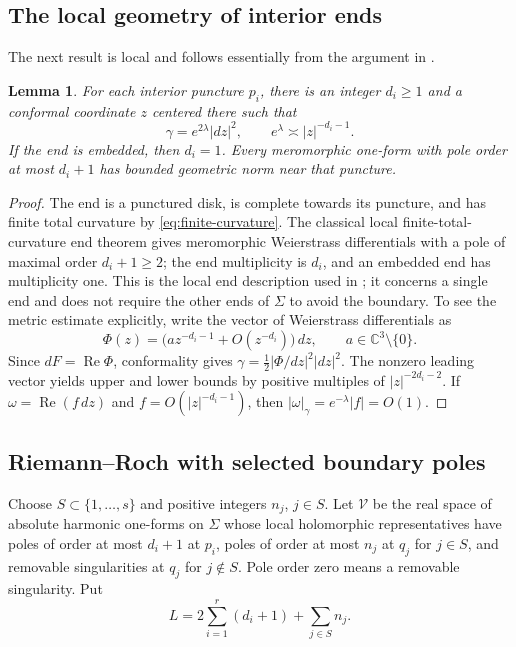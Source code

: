 \documentclass[11pt]{amsart}
\numberwithin{equation}{section}
\newtheorem{lemma}[theorem]{Lemma}
\theoremstyle{definition}
\theoremstyle{remark}
\newcommand{\C}{\mathbb C}
\DeclareMathOperator{\Rea}{Re}
\begin{document}
\subsection{The local geometry of interior ends}

The next result is local and follows essentially from the argument in \cite[Section~2.4]{CM23}.

\begin{lemma}\label{lem:interior-asymptotics}
For each interior puncture $p_i$, there is an integer $d_i\ge1$ and a conformal coordinate $z$ centered there such that
\[
\gamma=e^{2\lambda}|dz|^2,\qquad
 e^\lambda\asymp |z|^{-d_i-1}.
\]
If the end is embedded, then $d_i=1$. Every meromorphic one-form with pole order at most $d_i+1$ has bounded geometric norm near that puncture.
\end{lemma}
\begin{proof}
The end is a punctured disk, is complete towards its puncture, and has finite total curvature by \eqref{eq:finite-curvature}. The classical local finite-total-curvature end theorem gives meromorphic Weierstrass differentials with a pole of maximal order $d_i+1\ge2$; the end multiplicity is $d_i$, and an embedded end has multiplicity one. This is the local end description used in \cite[Section~2.4]{CM23}; it concerns a single end and does not require the other ends of $\Sigma$ to avoid the boundary. To see the metric estimate explicitly, write the vector of Weierstrass differentials as
\[
\Phi(z)=\bigl(a z^{-d_i-1}+O(z^{-d_i})\bigr)\,dz,
\qquad a\in\C^3\setminus\{0\}.
\]
Since $dF=\Rea\Phi$, conformality gives $\gamma=\tfrac12|\Phi/dz|^2|dz|^2$. The nonzero leading vector yields upper and lower bounds by positive multiples of $|z|^{-2d_i-2}$. If $\omega=\Rea(f\,dz)$ and $f=O(|z|^{-d_i-1})$, then $|\omega|_\gamma=e^{-\lambda}|f|=O(1)$.
\end{proof}

\subsection{Riemann--Roch with selected boundary poles}

Choose $S\subset\{1,\ldots,s\}$ and positive integers $n_j$,
$j\in S$. Let $\mathcal V$ be the real space of absolute harmonic
one-forms on $\Sigma$ whose local holomorphic representatives have
poles of order at most $d_i+1$ at $p_i$, poles of order at most
$n_j$ at $q_j$ for $j\in S$, and removable singularities at $q_j$
for $j\notin S$. Pole order zero means a removable singularity. Put
\[
L=2\sum_{i=1}^r(d_i+1)+\sum_{j\in S}n_j.
\]
\end{document}
